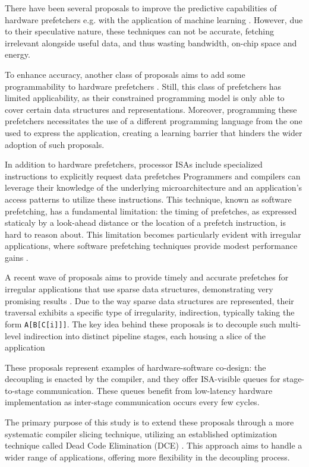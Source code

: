 \documentclass{acaces}
\begin{document}
There have been several proposals to improve the predictive capabilities of hardware prefetchers e.g. with the application of machine learning \cite{bera_pythia_2021}.
However, due to their speculative nature, these techniques can not be accurate, fetching irrelevant alongside useful data, and thus wasting bandwidth, on-chip space and energy.

To enhance accuracy, another class of proposals aims to add some programmability to hardware prefetchers \cite{talati_prodigy_2021}.
Still, this class of prefetchers has limited applicability, as their constrained programming model is only able to cover certain data structures and representations.
Moreover, programming these prefetchers necessitates the use of a different programming language from the one used to express the application,
creating a learning barrier that hinders the wider adoption of such proposals.

In addition to hardware prefetchers, processor ISAs include specialized instructions to explicitly request data prefetches
Programmers and compilers can leverage their knowledge of the underlying microarchitecture and an application's access patterns to utilize these instructions.
This technique, known as software prefetching, has a fundamental limitation:
the timing of prefetches, as expressed staticaly by a look-ahead distance or the location of a prefetch instruction, is hard to reason about.
This limitation becomes particularly evident with irregular applications,
where software prefetching techniques provide modest performance gains \cite{ainsworth_software_2018}.

A recent wave of proposals aims to provide timely and accurate prefetches for irregular applications that use sparse data structures,
demonstrating very promising results \cite{manocha_graphattack_2021, Nguyen2023}.
Due to the way sparse data structures are represented,
their traversal exhibits a specific type of irregularity, indirection, typically taking the form \texttt{A[B[C[i]]]}.
The key idea behind these proposals is to decouple such multi-level indirection into distinct pipeline stages, each housing a slice of the application

These proposals represent examples of hardware-software co-design:
the decoupling is enacted by the compiler, and they offer ISA-visible queues for stage-to-stage communication.
These queues benefit from low-latency hardware implementation as inter-stage communication occurs every few cycles.

The primary purpose of this study is to extend these proposals through a more systematic compiler slicing technique, utilizing an established optimization technique called Dead Code Elimination (DCE) \cite{cytron_efficiently_1991}.
This approach aims to handle a wider range of applications, offering more flexibility in the decoupling process.
\end{document}
